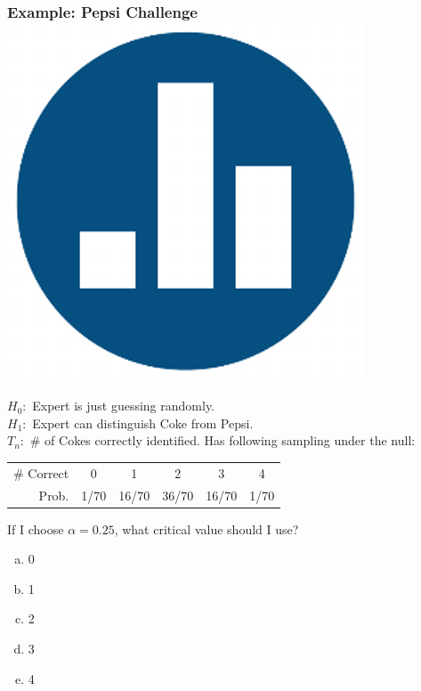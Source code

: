 \documentclass[handout]{beamer}
\begin{document}
\begin{frame}
\frametitle{Example: Pepsi Challenge \hfill \includegraphics[scale = 0.05]{./images/clicker}}
\footnotesize 
$H_0\colon$ Expert is just guessing randomly.\\
$H_1\colon$ Expert can distinguish Coke from Pepsi.\\
$T_n\colon$ \# of Cokes correctly identified. Has following sampling under the null:
		\begin{center}
		\begin{tabular}{rccccc}
		\hline \footnotesize
		\# Correct & 0 & 1 & 2 & 3 & 4\\
		Prob.&1/70 & 16/70 & 36/70 & 16/70 &1/70\\
		\hline
		\end{tabular}
	\end{center}
	\vspace{2em}
	\normalsize
	\alert{If I choose $\alpha =0.25$, what critical value should I use?}
	\begin{enumerate}[(a)]
		\item 0
		\item 1
		\item 2
		\item 3
		\item 4
	\end{enumerate}
\end{frame}
\end{document}
